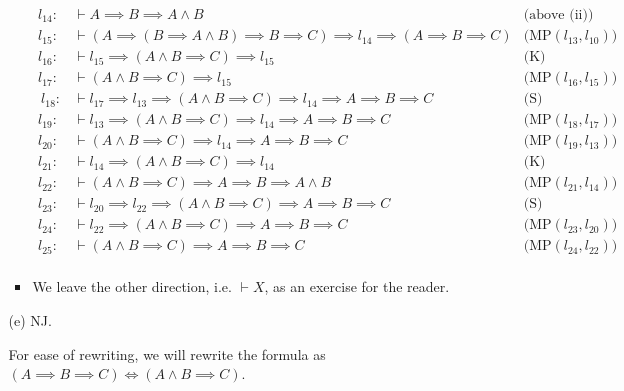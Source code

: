 \begin{itemize}
\begin{itemize}
\begin{itemize}
\begin{align*}
                l_{14}: &\vdash A \implies B \implies A \land B &\text{(above (ii))} \\
                l_{15}: &\vdash (A \implies (B \implies A \land B) \implies B \implies C) \implies l_{14} \implies (A \implies B \implies C) &\text{(MP$(l_{13}, l_{10})$)} \\
                l_{16}: &\vdash l_{15} \implies (A \land B \implies C) \implies l_{15} &\text{(K)} \\
                l_{17}: &\vdash (A \land B \implies C) \implies l_{15} &\text{(MP$(l_{16}, l_{15})$)} \\\
                l_{18}: &\vdash l_{17} \implies l_{13} \implies (A \land B \implies C) \implies l_{14} \implies A \implies B \implies C &\text{(S)} \\
                l_{19}: &\vdash l_{13} \implies (A \land B \implies C) \implies l_{14} \implies A \implies B \implies C &\text{(MP$(l_{18}, l_{17})$)} \\
                l_{20}: &\vdash (A \land B \implies C) \implies l_{14} \implies A \implies B \implies C &\text{(MP$(l_{19}, l_{13})$)} \\
                l_{21}: &\vdash l_{14} \implies (A \land B \implies C) \implies l_{14} &\text{(K)} \\
                l_{22}: &\vdash (A \land B \implies C) \implies A \implies B \implies A \land B &\text{(MP$(l_{21}, l_{14})$)} \\
                l_{23}: &\vdash l_{20} \implies l_{22} \implies (A \land B \implies C) \implies A \implies B \implies C &\text{(S)} \\
                l_{24}: &\vdash  l_{22} \implies (A \land B \implies C) \implies A \implies B \implies C &\text{(MP$(l_{23}, l_{20})$)} \\
                l_{25}: &\vdash (A \land B \implies C) \implies A \implies B \implies C &\text{(MP$(l_{24}, l_{22})$)} \\
            \end{align*}
            \item We leave the other direction, i.e. $\vdash X$, as an exercise for the reader.
         \end{itemize}
        
        \item[(e)] NJ.
    
        For ease of rewriting, we will rewrite the formula as 
        $(A \implies B \implies C) \iff (A \land B \implies C)$.


\end{itemize}
\end{itemize}
